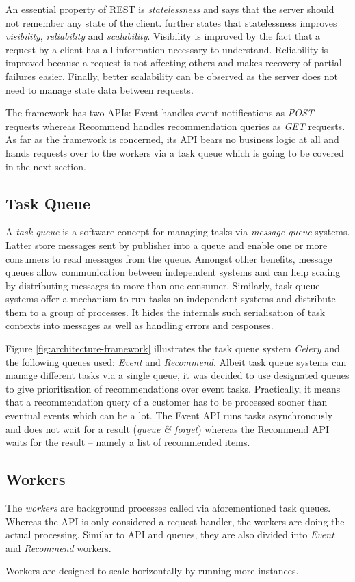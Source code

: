 An essential property of REST is \emph{statelessness} and says that the server should not remember any state of the client. \citet{fielding00} further states that statelessness improves \emph{visibility}, \emph{reliability} and \emph{scalability}. Visibility is improved by the fact that a  request by a client has all information necessary to understand. Reliability is improved because a request is not affecting others and makes recovery of partial failures easier. Finally, better scalability can be observed as the server does not need to manage state data between requests.

The framework has two APIs: Event handles event notifications as \emph{POST} requests whereas Recommend handles recommendation queries as \emph{GET} requests. As far as the framework is concerned, its API bears no business logic at all and hands requests over to the workers via a task queue which is going to be covered in the next section.

\subsection{Task Queue}

A \emph{task queue} is a software concept for managing tasks via \emph{message queue} systems. Latter store messages sent by publisher into a queue and enable one or more consumers to read messages from the queue. Amongst other benefits, message queues allow communication between independent systems and can help scaling by distributing messages to more than one consumer. Similarly, task queue systems offer a mechanism to run tasks on independent systems and distribute them to a group of processes. It hides the internals such serialisation of task contexts into messages as well as handling errors and responses.

Figure \ref{fig:architecture-framework} illustrates the task queue system \emph{Celery} and the following queues used: \emph{Event} and \emph{Recommend}. Albeit task queue systems can manage different tasks via a single queue, it was decided to use designated queues to give prioritisation of recommendations over event tasks. Practically, it means that a recommendation query of a customer has to be processed sooner than eventual events which can be a lot. The Event API runs tasks asynchronously and does not wait for a result (\emph{queue \& forget}) whereas the Recommend API waits for the result -- namely a list of recommended items.

\subsection{Workers}

The \emph{workers} are background processes called via aforementioned task queues. Whereas the API is only considered a request handler, the workers are doing the actual processing. Similar to API and queues, they are also divided into \emph{Event} and \emph{Recommend} workers.

Workers are designed to scale horizontally by running more instances.
